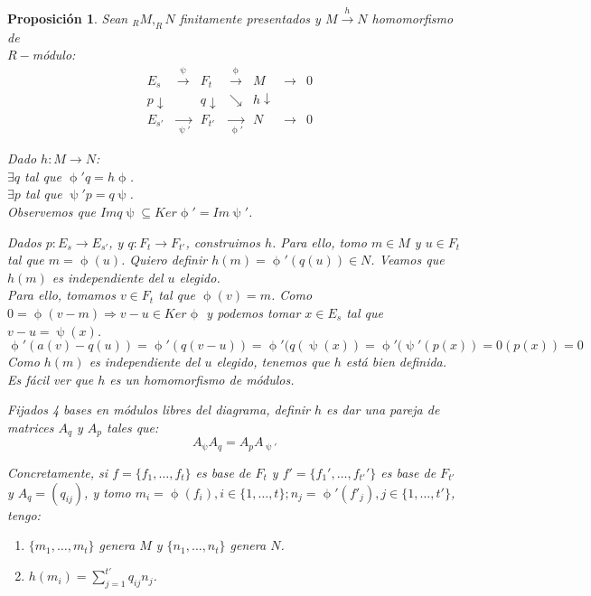\documentclass[11pt,a4paper]{article}
\theoremstyle{break}
\newtheorem{proposition}[theorem]{Proposición}
\begin{document}
\begin{proposition}
Sean $_{R}M, _{R}N$ finitamente presentados y $M \overset{h}{\to} N$ homomorfismo de \\ $R-$módulo:
$$\begin{aligned}
E_{s} & \overset{\uppsi}{\to} & F_{t} & \overset{\upphi}{\to} & M & \to & 0 \\
p \downarrow & & q \downarrow & \searrow & h \downarrow & & & \\
E_{s'} & \underset{\uppsi'}{\to} & F_{t'} & \underset{\upphi'}{\to} & N & \to & 0
\end{aligned}$$

Dado $h: M \to N$: \\
$\exists q$ tal que $\upphi ' q = h \upphi$. \\
$\exists p$ tal que $\uppsi ' p = q \uppsi$. \\
Observemos que $Im q\uppsi \subseteq Ker \upphi' = Im \uppsi'$.


Dados $p: E_{s} \to E_{s'}$, y $q: F_{t} \to F_{t'}$, construimos $h$. Para ello, tomo $m \in M$ y $u \in F_{t}$ tal que $m = \upphi(u)$. Quiero definir $h(m) = \upphi'(q(u)) \in N$. Veamos que $h(m)$ es independiente del $u$ elegido. \\
Para ello, tomamos $v \in F_{t}$ tal que $\upphi(v) = m$. Como $0 = \upphi(v-m) \Rightarrow v-u \in Ker\upphi$ y podemos tomar $x \in E_{s}$ tal que $v-u = \uppsi(x)$.
$$\upphi'(a(v) - q(u)) = \upphi'(q(v-u)) = \upphi'(q(\uppsi(x)) = \upphi'(\uppsi'(p(x)) = 0(p(x)) = 0$$
Como $h(m)$ es independiente del $u$ elegido, tenemos que $h$ está bien definida. Es fácil ver que $h$ es un homomorfismo de módulos.

Fijados 4 bases en módulos libres del diagrama, definir $h$ es dar una pareja de matrices $A_{q}$ y $A_{p}$ tales que:
$$A_{\uppsi} A_{q} = A_{p} A_{\uppsi'}$$

\vspace{0.3cm}

Concretamente, si $f = \{f_{1}, \dots, f_{t}\}$ es base de $F_{t}$ y $f' = \{f_{1}', \dots, f_{t'}'\}$ es base de $F_{t'}$ y $A_{q} = (q_{ij})$, y tomo $m_{i} = \upphi(f_{i}), i \in \{1, \dots, t\}; n_{j} = \upphi'(f'_{j}), j \in \{1, \dots, t'\}$, tengo:
\begin{enumerate}
\item $\{m_{1}, \dots, m_{t}\}$ genera $M$ y $\{n_{1}, \dots, n_{t}\}$ genera $N$.
\item $h(m_{i}) = \sum\limits_{j=1}^{t'} q_{ij} n_{j}$.
\end{enumerate}
\end{proposition}
\end{document}
